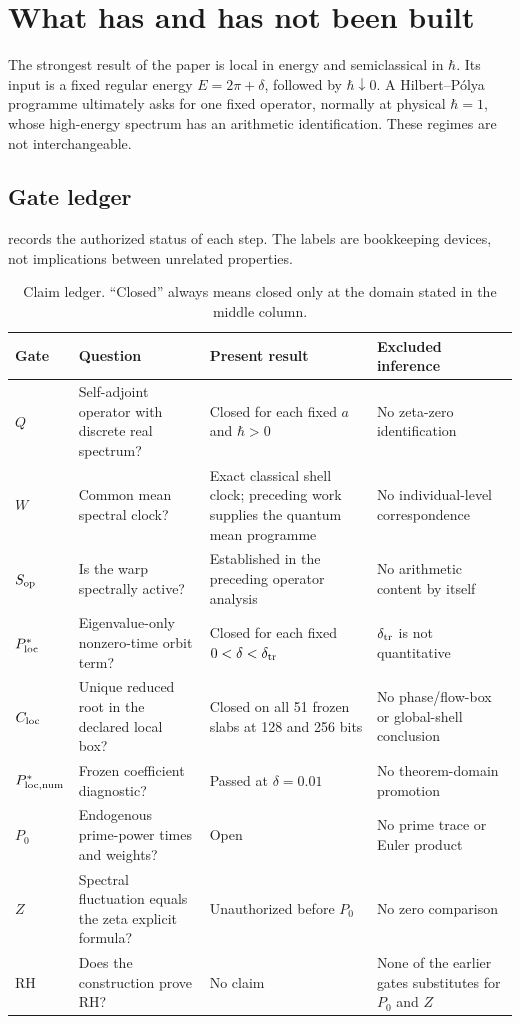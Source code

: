 \section{What has and has not been built}
\label{sec:scope}

The strongest result of the paper is local in energy and semiclassical in
\(\hbar\).  Its input is a fixed regular energy
\(E=2\pi+\delta\), followed by \(\hbar\downarrow0\).  A Hilbert--P\'olya
programme ultimately asks for one fixed operator, normally at physical
\(\hbar=1\), whose high-energy spectrum has an arithmetic identification.
These regimes are not interchangeable.

\subsection{Gate ledger}

 records the authorized status of each step.  The
labels are bookkeeping devices, not implications between unrelated
properties.

\begin{table}[t]
\centering
\caption{Claim ledger.  ``Closed'' always means closed only at the domain
stated in the middle column.}
\label{tab:gate-ledger}
\small
\begin{tabular}{@{}p{}p{}p{}p{}@{}}
\toprule
Gate & Question & Present result & Excluded inference\\
\midrule
\(Q\) & Self-adjoint operator with discrete real spectrum? &
Closed for each fixed \(a\) and \(\hbar>0\) &
No zeta-zero identification\\
\(W\) & Common mean spectral clock? &
Exact classical shell clock; preceding work supplies the quantum mean
programme &
No individual-level correspondence\\
\(S_{\rm op}\) & Is the warp spectrally active? &
Established in the preceding operator analysis &
No arithmetic content by itself\\
\(P^*_{\rm loc}\) & Eigenvalue-only nonzero-time orbit term? &
Closed for each fixed \(0<\delta<\delta_{\rm tr}\) &
\(\delta_{\rm tr}\) is not quantitative\\
\(C_{\rm loc}\) & Unique reduced root in the declared local box? &
Closed on all 51 frozen slabs at 128 and 256 bits &
No phase/flow-box or global-shell conclusion\\
\(P^*_{\rm loc,num}\) & Frozen coefficient diagnostic? &
Passed at \(\delta=0.01\) &
No theorem-domain promotion\\
\(P_0\) & Endogenous prime-power times and weights? &
Open &
No prime trace or Euler product\\
\(Z\) & Spectral fluctuation equals the zeta explicit formula? &
Unauthorized before \(P_0\) &
No zero comparison\\
RH & Does the construction prove RH? &
No claim &
None of the earlier gates substitutes for \(P_0\) and \(Z\)\\
\bottomrule
\end{tabular}
\end{table}

